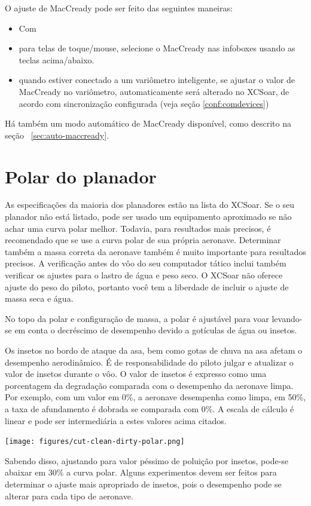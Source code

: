 O ajuste de MacCready pode ser feito das seguintes maneiras:
\begin{itemize}
\item Com \blink{}
\item para telas de toque/mouse, selecione o MacCready nas infoboxes usando as teclas acima/abaixo.
\item quando estiver conectado a um variômetro inteligente, se ajustar o valor de MacCready no variômetro, automaticamente será alterado no XCSoar, de acordo com sincronização configurada (veja seção \ref{conf:comdevices})
\end{itemize}
Há também um modo automático de MacCready disponível, como descrito na seção ~\ref{sec:auto-maccready}.


\section{Polar do planador}\label{sec:glidepolar}

As especificações da maioria dos planadores estão na lista do XCSoar.  
Se o seu planador não está listado, pode ser usado um equipamento aproximado se não achar uma curva polar melhor.  Todavia, para resultados mais precisos, é recomendado que se use a curva polar de sua própria aeronave.  Determinar também a massa correta da aeronave também é muito importante para resultados precisos.  A verificação antes do vôo do seu computador tático inclui também verificar os ajustes para o lastro de água e peso seco.    O XCSoar não oferece ajuste do peso do piloto, portanto você tem a liberdade de incluir o ajuste de massa seca e água. 

No topo da polar e configuração de massa, a polar é ajustável para voar levando-se em conta o decréscimo de desempenho devido a gotículas de água ou insetos.

Os insetos no bordo de ataque da asa, bem como gotas de chuva na asa afetam o desempenho aerodinâmico.  É de responsabilidade do piloto julgar e atualizar o valor de insetos durante o vôo.  O valor de insetos é expresso como uma porcentagem da degradação comparada com o desempenho da aeronave limpa.  Por exemplo, com um valor em 0\%, a aeronave desempenha como limpa, em 50\%, a taxa de afundamento é dobrada se comparada com 0\%.  A escala de cálculo é linear e pode ser intermediária a estes valores acima citados.

\begin{center}
\texttt{[image: figures/cut-clean-dirty-polar.png]}
\end{center}
Sabendo disso, ajustando para valor péssimo de poluição por insetos, pode-se abaixar em 30\% a curva polar.  Alguns experimentos devem ser feitos para determinar o ajuste mais apropriado de insetos, pois o desempenho pode se alterar para cada tipo de aeronave.

